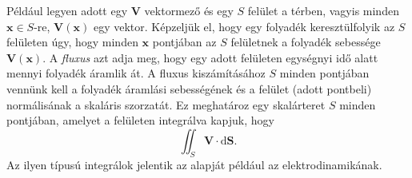 \documentclass[DIV=15,appendixprefix]{scrreprt}
\theoremstyle{definition}
\theoremstyle{remark}
\begin{document}
Például legyen adott egy $ \mathbf{ V } $ vektormező és egy $ S $ felület a térben, vagyis minden
$ \mathbf{ x } \in S $-re, $ \mathbf{ V } \left( \mathbf{ x } \right) $ egy vektor. Képzeljük el,
hogy egy folyadék keresztülfolyik az $ S $ felületen úgy, hogy minden $ \mathbf{ x } $ pontjában az
$ S $ felületnek a folyadék sebessége $ \mathbf{ V } \left( \mathbf{ x } \right) $. A \emph{fluxus}
azt adja meg, hogy egy adott felületen egységnyi idő alatt mennyi folyadék áramlik át. A fluxus
kiszámításához $ S $ minden pontjában vennünk kell a folyadék áramlási sebességének és a felület
(adott pontbeli) normálisának a skaláris szorzatát. Ez meghatároz egy skalárteret $ S $ minden
pontjában, amelyet a felületen integrálva kapjuk, hogy
\begin{equation*}
	\iint_{ S } \mathbf{ V } \cdot \mathrm{ d } \mathbf{ S }.
\end{equation*}
Az ilyen típusú integrálok jelentik az alapját például az elektrodinamikának.
\end{document}
